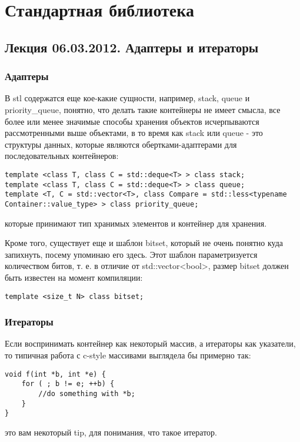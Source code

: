 \chapter{Стандартная библиотека}

\section{Лекция 06.03.2012. Адаптеры и итераторы}

\subsection{Адаптеры}

В stl содержатся еще кое-какие сущности, например, stack, queue и priority\_queue, понятно, что делать такие контейнеры не имеет смысла, все более или менее
значимые способы хранения объектов исчерпываются рассмотренными выше объектами, в то время как stack или queue - это структуры данных, которые являются
обертками-адаптерами для последовательных контейнеров:
\begin{lstlisting}
template <class T, class C = std::deque<T> > class stack;
template <class T, class C = std::deque<T> > class queue;
template <T, C = std::vector<T>, class Compare = std::less<typename Container::value_type> > class priority_queue;
\end{lstlisting}
которые принимают тип хранимых элементов и контейнер для хранения.

Кроме того, существует еще и шаблон bitset, который не очень понятно куда запихнуть, посему упоминаю его здесь. Этот шаблон параметризуется количеством битов,
т. е. в отличие от std::vector<bool>, размер bitset должен быть известен на момент компиляции:
\begin{lstlisting}
template <size_t N> class bitset;
\end{lstlisting}

\subsection{Итераторы}

Если воспринимать контейнер как некоторый массив, а итераторы как указатели, то типичная работа с c-style массивами выглядела бы примерно так:
\begin{lstlisting}
void f(int *b, int *e) {
	for ( ; b != e; ++b) {
		//do something with *b;
	}
}
\end{lstlisting}
это вам некоторый tip, для понимания, что такое итератор.

